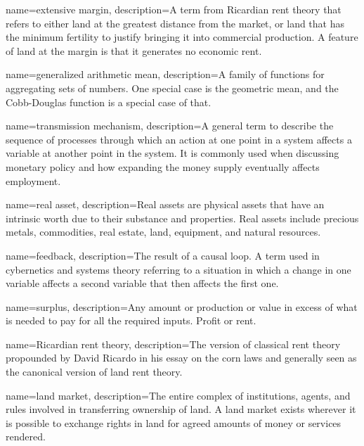 {
name=extensive margin,
description={A term from Ricardian rent theory that refers to either land at the greatest distance from the market, or land that has the minimum fertility to justify bringing it into commercial production. A feature of land at the margin is that it generates no \gls{economic rent}.}
}

{
name=generalized arithmetic mean,
description={A family of functions for aggregating sets of numbers. One special case is the geometric mean,  and the Cobb-Douglas function is a special case of that.} %
}

{
name=transmission mechanism,
description={A general term to describe the sequence of processes through which an action at one point in a system  affects a variable at another point in the system. It is commonly used when discussing  monetary policy and how  expanding the money supply eventually affects employment.}
}

{
name=real asset,
description={Real assets are physical assets that have an intrinsic worth due to their substance and properties. Real assets include precious metals, commodities, real estate, land, equipment, and natural resources. }
}


{
name=feedback,
description={The result of a causal loop. A term used in cybernetics and systems theory referring to a situation in which a change in one variable affects a second variable that then affects the first one.}
}

{
name=surplus,
description={Any amount or production or value in excess of what  is needed to pay for all the required inputs. Profit or rent. }
}

{
name=Ricardian rent theory,
description={The version of classical rent theory propounded by David Ricardo in his essay on the corn laws and generally seen as the  canonical version of land rent theory.}
}

{
name=land market,
description={The entire complex of institutions, agents, and rules involved in transferring ownership of land. A land market exists wherever it is possible to exchange rights in land for agreed amounts of money or services rendered.}
}

